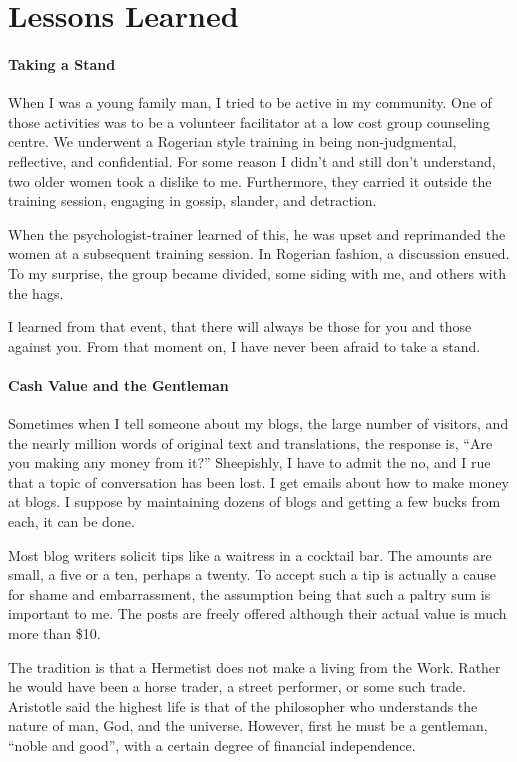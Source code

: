 \section{Lessons Learned}

\paragraph{Taking a Stand}


When I was a young family man, I tried to be active in my community. One of those activities was to be a volunteer facilitator at a low cost group counseling centre. We underwent a Rogerian style training in being non-judgmental, reflective, and confidential. For some reason I didn't and still don't understand, two older women took a dislike to me. Furthermore, they carried it outside the training session, engaging in gossip, slander, and detraction.

When the psychologist-trainer learned of this, he was upset and reprimanded the women at a subsequent training session. In Rogerian fashion, a discussion ensued. To my surprise, the group became divided, some siding with me, and others with the hags.

I learned from that event, that there will always be those for you and those against you. From that moment on, I have never been afraid to take a stand.

\paragraph{Cash Value and the Gentleman}


Sometimes when I tell someone about my blogs, the large number of visitors, and the nearly million words of original text and translations, the response is, ``Are you making any money from it?'' Sheepishly, I have to admit the no, and I rue that a topic of conversation has been lost. I get emails about how to make money at blogs. I suppose by maintaining dozens of blogs and getting a few bucks from each, it can be done.

Most blog writers solicit tips like a waitress in a cocktail bar. The amounts are small, a five or a ten, perhaps a twenty. To accept such a tip is actually a cause for shame and embarrassment, the assumption being that such a paltry sum is important to me. The posts are freely offered although their actual value is much more than \$10.

The tradition is that a Hermetist does not make a living from the Work. Rather he would have been a horse trader, a street performer, or some such trade. Aristotle said the highest life is that of the philosopher who understands the nature of man, God, and the universe. However, first he must be a gentleman, ``noble and good'', with a certain degree of financial independence.

